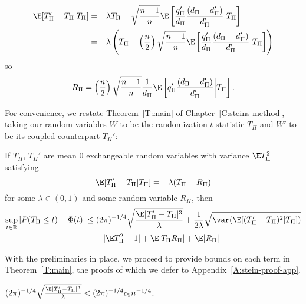 \begin{align*}
  \E[T_{\Pi}'-T_{\Pi}|T_{\Pi}]
  &= - \lambda T_{\Pi} + \sqrt{\frac{n-1}{n}}
  \E\left [\frac{q_{\Pi}'}{d_{\Pi}} \frac{(d_{\Pi}-d_{\Pi}')}{d_{\Pi}'}\middle |T_{\Pi} \right ] \\
  &= - \lambda \left ( T_{\Pi} - \left ( \frac{n}{2} \right )
    \sqrt{\frac{n-1}{n}}
    \E\left [\frac{q_{\Pi}'}{d_{\Pi}} \frac{(d_{\Pi}-d_{\Pi}')}{d_{\Pi}'}\middle |T_{\Pi} \right ] \right )
\end{align*}
so
\begin{equation}
  \label{def:Rdef}
  R_{\Pi} = \left (\frac{n}{2}\right )\sqrt{\frac{n-1}{n}}\frac{1}{d_{\Pi}}\E
  \left [q_{\Pi}'\frac{(d_{\Pi}-d_{\Pi}')}{d_{\Pi}'} \middle | T_{\Pi} \right ].
\end{equation}

For convenience, we restate Theorem~\ref{T:main} of
Chapter~\ref{C:steins-method}, taking our random variables $W$ to be
the randomization $t$-statistic $T_{\Pi}$ and $W'$ to be its coupled
counterpart $T_{\Pi}'$:
\begin{thma}
  If $T_{\Pi}$, $T_{\Pi}'$ are mean 0 exchangeable random variables with variance $\E T_{\Pi}^2$
  satisfying
  \begin{equation*}
    \E[T_{\Pi}'-T_{\Pi}|T_{\Pi}] = -\lambda(T_{\Pi}-R_{\Pi})
  \end{equation*}
  for some $\lambda \in (0,1)$ and some random variable $R_{\Pi}$, then
  \begin{equation*}
    \begin{split}
      \sup_{t \in \mathbb{R}} |P(T_{\Pi} \leq t) - \Phi(t)|
      &\leq (2\pi)^{-1/4} \sqrt{\frac{\E |T_{\Pi}'-T_{\Pi}|^3}{\lambda}}
      + \frac{1}{2\lambda} \sqrt{\var (\E [(T_{\Pi}'-T_{\Pi})^2|T_{\Pi}])} \\
      &\quad + |\E T_{\Pi}^2 - 1| + \E |T_{\Pi}R_{\Pi}| + \E |R_{\Pi}|
    \end{split}
  \end{equation*}
\end{thma}

With the preliminaries in place, we proceed to provide bounds on each
term in Theorem~\ref{T:main}, the proofs of which we defer to Appendix~\ref{A:stein-proof-app}.

\begin{proposition}
  \label{P:P3}
  $(2\pi)^{-1/4}\sqrt{\frac{\E|T_{\Pi}'-T_{\Pi}|^3}{\lambda}}
  < (2\pi)^{-1/4} c_9 n^{-1/4}$.
\end{proposition}

